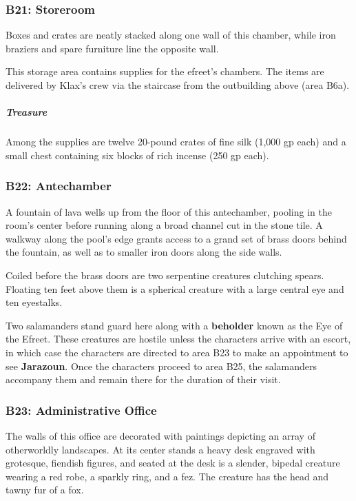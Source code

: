 \documentclass[10pt,a4paper,twoside,bg=print,twocolumn,openany,nodeprecatedcode]{dndbook}
\begin{document}
\subsubsection{B21: Storeroom}
\begin{DndReadAloud}{}
Boxes and crates are neatly stacked along one wall of this chamber, while iron braziers and spare furniture line the opposite wall.

\end{DndReadAloud}

This storage area contains supplies for the efreet's chambers. The items are delivered by Klax's crew via the staircase from the outbuilding above (area B6a).

\subparagraph{Treasure}
Among the supplies are twelve 20-pound crates of fine silk (1,000 gp each) and a small chest containing six blocks of rich incense (250 gp each).

\subsubsection{B22: Antechamber}
\begin{DndReadAloud}{}
A fountain of lava wells up from the floor of this antechamber, pooling in the room's center before running along a broad channel cut in the stone tile. A walkway along the pool's edge grants access to a grand set of brass doors behind the fountain, as well as to smaller iron doors along the side walls.

Coiled before the brass doors are two serpentine creatures clutching spears. Floating ten feet above them is a spherical creature with a large central eye and ten eyestalks.

\end{DndReadAloud}

Two salamanders stand guard here along with a \textbf{beholder} known as the Eye of the Efreet. These creatures are hostile unless the characters arrive with an escort, in which case the characters are directed to area B23 to make an appointment to see \textbf{Jarazoun}. Once the characters proceed to area B25, the salamanders accompany them and remain there for the duration of their visit.

\subsubsection{B23: Administrative Office}
\begin{DndReadAloud}{}
The walls of this office are decorated with paintings depicting an array of otherworldly landscapes. At its center stands a heavy desk engraved with grotesque, fiendish figures, and seated at the desk is a slender, bipedal creature wearing a red robe, a sparkly ring, and a fez. The creature has the head and tawny fur of a fox.

\end{DndReadAloud}
\end{document}

